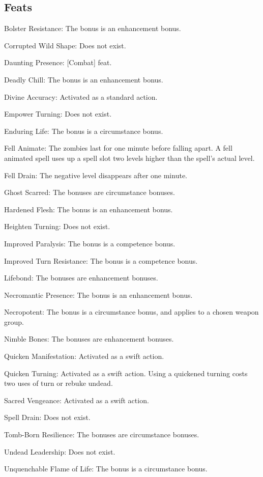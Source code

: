 \subsection{Feats}
\begin{itemize*}
\item Bolster Resistance: The bonus is an enhancement bonus.
\item Corrupted Wild Shape: Does not exist.
\item Daunting Presence: [Combat] feat.
\item Deadly Chill: The bonus is an enhancement bonus.
\item Divine Accuracy: Activated as a standard action.
\item Empower Turning: Does not exist.
\item Enduring Life: The bonus is a circumstance bonus.
\item Fell Animate: The zombies last for one minute before falling apart. A fell animated spell uses up a spell slot two levels higher than the spell's actual level.
\item Fell Drain: The negative level disappears after one minute.
\item Ghost Scarred: The bonuses are circumstance bonuses.
\item Hardened Flesh: The bonus is an enhancement bonus.
\item Heighten Turning: Does not exist.
\item Improved Paralysis: The bonus is a competence bonus.
\item Improved Turn Resistance: The bonus is a competence bonus.
\item Lifebond: The bonuses are enhancement bonuses.
\item Necromantic Presence: The bonus is an enhancement bonus.
\item Necropotent: The bonus is a circumstance bonus, and applies to a chosen weapon group.
\item Nimble Bones: The bonuses are enhancement bonuses.
\item Quicken Manifestation: Activated as a swift action.
\item Quicken Turning: Activated as a swift action. Using a quickened turning costs two uses of turn or rebuke undead.
\item Sacred Vengeance: Activated as a swift action.
\item Spell Drain: Does not exist.
\item Tomb-Born Resilience: The bonuses are circumstance bonuses.
\item Undead Leadership: Does not exist.
\item Unquenchable Flame of Life: The bonus is a circumstance bonus.
\end{itemize*}


